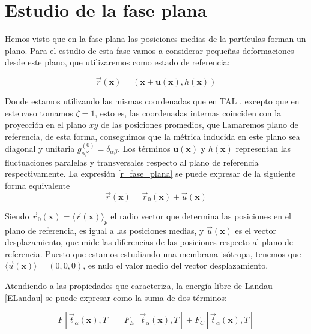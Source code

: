 \section{Estudio de la fase plana}

Hemos visto que en la fase plana las posiciones medias de la partículas forman
un plano. Para el estudio de esta fase vamos a considerar pequeñas
deformaciones desde este plano, que utilizaremos como estado de referencia:

\begin{equation}\label{r_fase_plana}
\vec{r}(\mathbf{x})=(\mathbf{x}+\mathbf{u(\mathbf{x})},h(\mathbf{x}))
\end{equation}

Donde estamos utilizando las mismas coordenadas que en TAL , excepto que en
este caso tomamos $\zeta=1$, esto es, las coordenadas internas coinciden con
la proyección en el plano $xy$ de las posiciones promedios, que llamaremos
plano de referencia, de esta forma, conseguimos que la métrica inducida en
este plano sea diagonal y unitaria
$g^{(0)}_{\alpha\beta}=\delta_{\alpha\beta}$. Los términos
$\mathbf{u(\mathbf{x})}$ y $h(\mathbf{x})$ 
representan las fluctuaciones paralelas y transversales respecto al plano de
referencia respectivamente. La expresión \eqref{r_fase_plana} se puede
expresar de la siguiente forma equivalente
\begin{equation}\label{deformacion}
\vec{r}(\mathbf{x})=\vec{r}_0(\mathbf{x})+\vec{u}(\mathbf{x})
\end{equation}

Siendo $\vec{r}_0(\mathbf{x})=\langle\vec{r}(\mathbf{x}) \rangle_p$ el radio
vector que determina las posiciones en el plano de referencia, es igual a las
posiciones medias, y $\vec{u}(\mathbf{x})$ es el vector desplazamiento, que
mide las diferencias de las posiciones respecto al plano de referencia. Puesto
que estamos estudiando una membrana isótropa, tenemos que
$\langle\vec{u}(\mathbf{x}) \rangle=(0,0,0)$, es nulo el valor medio del
vector desplazamiento.

Atendiendo a las propiedades que caracteriza, la energía libre de Landau
\eqref{ELandau} se puede expresar como la suma de dos términos:

\begin{equation}
 F[\vec{t}_{\alpha}(\mathbf{x}),T]= F_E[\vec{t}_{\alpha}(\mathbf{x}),T]+F_C[\vec{t}_{\alpha}(\mathbf{x}),T]
\end{equation}

